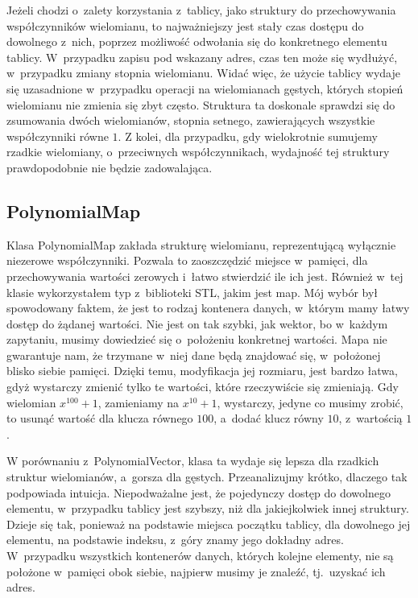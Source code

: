 Jeżeli chodzi o~zalety korzystania z~tablicy, jako struktury do przechowywania współczynników wielomianu, to najważniejszy jest stały czas dostępu do dowolnego z~nich, poprzez możliwość odwołania się do konkretnego elementu tablicy. W~przypadku zapisu pod wskazany adres, czas ten może się wydłużyć, w~przypadku zmiany stopnia wielomianu. Widać więc, że użycie tablicy wydaje się uzasadnione w~przypadku operacji na wielomianach gęstych, których stopień wielomianu nie zmienia się zbyt często. Struktura ta doskonale sprawdzi się do zsumowania dwóch wielomianów, stopnia setnego, zawierających wszystkie współczynniki równe $1$. Z kolei, dla przypadku, gdy wielokrotnie sumujemy rzadkie wielomiany, o~przeciwnych współczynnikach, wydajność tej struktury prawdopodobnie nie będzie zadowalająca.

\subsection{PolynomialMap}

Klasa PolynomialMap zakłada strukturę wielomianu, reprezentującą wyłącznie niezerowe współczynniki.
Pozwala to zaoszczędzić miejsce w~pamięci, dla przechowywania wartości zerowych i~łatwo stwierdzić ile ich jest. Również w~tej klasie wykorzystałem typ z~biblioteki STL, jakim jest map. Mój wybór był spowodowany faktem, że jest to rodzaj kontenera danych, w~którym mamy łatwy dostęp do żądanej wartości. Nie jest on tak szybki, jak wektor, bo w~każdym zapytaniu, musimy dowiedzieć się o~położeniu konkretnej wartości. Mapa nie gwarantuje nam, że trzymane w~niej dane będą znajdować się, w~położonej blisko siebie pamięci. Dzięki temu, modyfikacja jej rozmiaru, jest bardzo łatwa, gdyż wystarczy zmienić tylko te wartości, które rzeczywiście się zmieniają. Gdy wielomian $x^{100} + 1$, zamieniamy na $x^{10} + 1$, wystarczy, jedyne co musimy zrobić, to usunąć wartość dla klucza równego $100$, a~dodać klucz równy $10$, z~wartością $1$.

W porównaniu z~PolynomialVector, klasa ta wydaje się lepsza dla rzadkich struktur wielomianów, a~gorsza dla gęstych. Przeanalizujmy krótko, dlaczego tak podpowiada intuicja. Niepodważalne jest, że pojedynczy dostęp do dowolnego elementu, w~przypadku tablicy jest szybszy, niż dla jakiejkolwiek innej struktury. Dzieje się tak, ponieważ na podstawie miejsca początku tablicy, dla dowolnego jej elementu, na podstawie indeksu, z~góry znamy jego dokładny adres. W~przypadku wszystkich kontenerów danych, których kolejne elementy, nie są położone w~pamięci obok siebie, najpierw musimy je znaleźć, tj.\ uzyskać ich adres.

